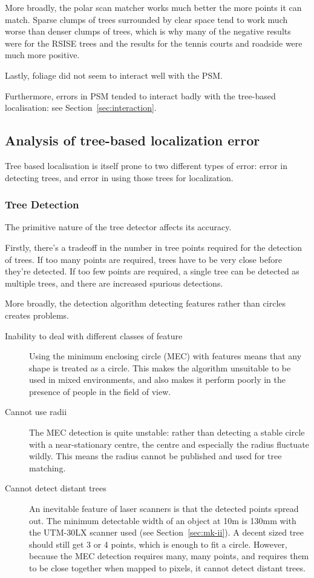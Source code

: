 \documentclass[12pt,oneside,a4paper]{book}
\begin{document}
More broadly, the polar scan matcher works much better the more points
it can match. Sparse clumps of trees surrounded by clear space tend to
work much worse than denser clumps of trees, which is why many of the
negative results were for the RSISE trees and the results for the
tennis courts and roadside were much more positive.

Lastly, foliage did not seem to interact well with the PSM.

Furthermore, errors in PSM tended to interact badly with the
tree-based localisation: see Section~\ref{sec:interaction}.

\subsection{Analysis of tree-based localization error}
\label{sec:tree-error}

Tree based localisation is itself prone to two different types of
error: error in detecting trees, and error in using those trees for
localization.

\subsubsection{Tree Detection}
\label{sec:tree-detection}

The primitive nature of the tree detector affects its accuracy. 

Firstly, there's a tradeoff in the number in tree points required for
the detection of trees. If too many points are required, trees have to be very
close before they're detected. If too few points are required, a
single tree can be detected as multiple trees, and there are increased spurious detections.

More broadly, the detection algorithm detecting features rather than
circles creates problems.

\begin{description}
\item[Inability to deal with different classes of feature] Using the
  minimum enclosing circle (MEC) with features means that any shape is
  treated as a circle. This makes the algorithm unsuitable to be used
  in mixed environments, and also makes it perform poorly in the
  presence of people in the field of view.
\item[Cannot use radii] The MEC detection is quite unstable: rather
  than detecting a stable circle with a near-stationary centre, the
  centre and especially the radius fluctuate wildly. This means the
  radius cannot be published and used for tree matching.
\item[Cannot detect distant trees] An inevitable feature of laser
  scanners is that the detected points spread out. The minimum
  detectable width of an object at 10m is 130mm with the UTM-30LX
  scanner used (see Section~\ref{sec:mk-ii}). A decent sized tree
  should still get 3 or 4 points, which is enough to fit a
  circle. However, because the MEC detection requires many, many
  points, and requires them to be close together when mapped to
  pixels, it cannot detect distant trees.
\end{description}
\end{document}
